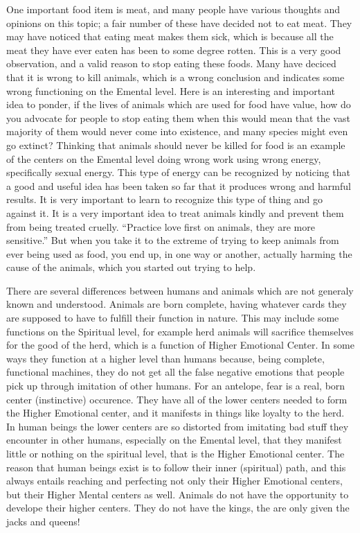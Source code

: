 \documentclass[12pt,letterpaper]{book}
\begin{document}
One important food item is meat, and many people have various thoughts and opinions on this topic; a fair number of these have decided not to eat meat. They may have noticed that eating meat makes them sick, which is because all the meat they have ever eaten has been to some degree rotten. This is a very good observation, and a valid reason to stop eating these foods. Many have deciced that it is wrong to kill animals, which is a wrong conclusion and indicates some wrong functioning on the Emental level. Here is an interesting and important idea to ponder, if the lives of animals which are used for food have value, how do you advocate for people to stop eating them when this would mean that the vast majority of them would never come into existence, and many species might even go extinct? Thinking that animals should never be killed for food is an example of the centers on the Emental level doing wrong work using wrong energy, specifically sexual energy. This type of energy can be recognized by noticing that a good and useful idea has been taken so far that it produces wrong and harmful results. It is very important to learn to recognize this type of thing and go against it. It is a very important idea to treat animals kindly and prevent them from being treated cruelly. ``Practice love first on animals, they are more sensitive.'' But when you take it to the extreme of trying to keep animals from ever being used as food, you end up, in one way or another, actually harming the cause of the animals, which you started out trying to help.

There are several differences between humans and animals which are not generaly known and understood. Animals are born complete, having whatever cards they are supposed to have to fulfill their function in nature. This may include some functions on the Spiritual level, for example herd animals will sacrifice themselves for the good of the herd, which is a function of Higher Emotional Center. In some ways they function at a higher level than humans because, being complete, functional machines, they do not get all the false negative emotions that people pick up through imitation of other humans. For an antelope, fear is a real, born center (instinctive) occurence. They have all of the lower centers needed to form the Higher Emotional center, and it manifests in things like loyalty to the herd. In human beings the lower centers are so distorted from imitating bad stuff they encounter in other humans, especially on the Emental level, that they manifest little or nothing on the spiritual level, that is the Higher Emotional center. The reason that human beings exist is to follow their inner (spiritual) path, and this always entails reaching and perfecting not only their Higher Emotional centers, but their Higher Mental centers as well. Animals do not have the opportunity to develope their higher centers. They do not have the kings, the are only given the jacks and queens!
\end{document}
